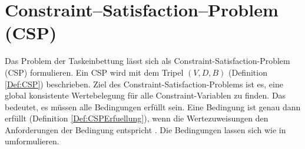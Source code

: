 
\section{Constraint--Satisfaction--Problem (CSP)}

Das Problem der Taskeinbettung lässt sich als Constraint-Satisfaction-Problem (CSP) formulieren. Ein CSP wird mit dem Tripel $(V, D, B)$ (Definition \ref{Def:CSP})  beschrieben. Ziel des Constraint-Satisfaction-Problems ist es, eine global konsistente Wertebelegung für alle Constraint-Variablen zu finden. Das bedeutet, es müssen alle Bedingungen erfüllt sein. Eine Bedingung ist genau dann erfüllt (Definition \ref{Def:CSPErfuellung}), wenn die Wertezuweisungen den Anforderungen der Bedingung entspricht \cite{handbuchkuenstlicheIntelligenz}. Die Bedingungen lassen sich wie in \cite{jaeger}  umformulieren. 


